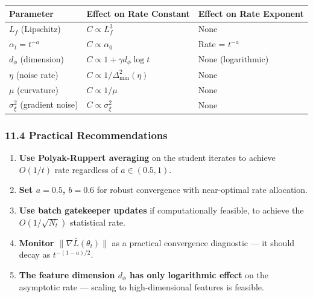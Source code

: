 \documentclass[
  12pt,
]{article}
\providecommand{\tightlist}{%
  \setlength{\itemsep}{0pt}\setlength{\parskip}{0pt}}
\begin{document}
\begin{longtable}[]{@{}
  >{\raggedright\arraybackslash}p{}
  >{\raggedright\arraybackslash}p{}
  >{\raggedright\arraybackslash}p{}@{}}
\toprule\noalign{}
\begin{minipage}[b]{\linewidth}\raggedright
Parameter
\end{minipage} & \begin{minipage}[b]{\linewidth}\raggedright
Effect on Rate Constant
\end{minipage} & \begin{minipage}[b]{\linewidth}\raggedright
Effect on Rate Exponent
\end{minipage} \\
\midrule\noalign{}
\endhead
\bottomrule\noalign{}
\endlastfoot
\(L_f\) (Lipschitz) & \(C \propto L_f^3\) & None \\
\(\alpha_t = t^{-a}\) & \(C \propto \alpha_0\) & Rate = \(t^{-a}\) \\
\(d_\phi\) (dimension) & \(C \propto 1 + \gamma d_\phi \log t\) & None
(logarithmic) \\
\(\eta\) (noise rate) & \(C \propto 1/\Delta_{\min}^2(\eta)\) & None \\
\(\mu\) (curvature) & \(C \propto 1/\mu\) & None \\
\(\sigma_\xi^2\) (gradient noise) & \(C \propto \sigma_\xi^2\) & None \\
\end{longtable}

\subsubsection{11.4 Practical
Recommendations}\label{practical-recommendations}

\begin{enumerate}
\def\labelenumi{\arabic{enumi}.}
\tightlist
\item
  \textbf{Use Polyak-Ruppert averaging} on the student iterates to
  achieve \(O(1/t)\) rate regardless of \(a \in (0.5, 1)\).
\item
  \textbf{Set \(a = 0.5\), \(b = 0.6\)} for robust convergence with
  near-optimal rate allocation.
\item
  \textbf{Use batch gatekeeper updates} if computationally feasible, to
  achieve the \(O(1/\sqrt{N_t})\) statistical rate.
\item
  \textbf{Monitor \(\|\nabla \bar{L}(\theta_t)\|\)} as a practical
  convergence diagnostic --- it should decay as \(t^{-(1-a)/2}\).
\item
  \textbf{The feature dimension \(d_\phi\) has only logarithmic effect}
  on the asymptotic rate --- scaling to high-dimensional features is
  feasible.
\end{enumerate}
\end{document}

